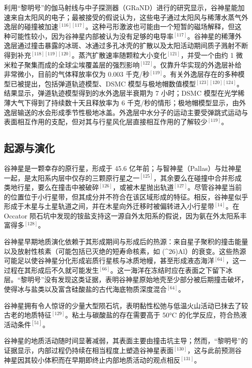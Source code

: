 利用“黎明号”的伽马射线与中子探测器（GRaND）进行的研究显示，谷神星能加速来自太阳风的电子；最被接受的假说认为，这些电子通过太阳风与稀薄水蒸气外逸层的碰撞被加速$^{[116][117]}$。这种弓形激波也可能由一个短暂的磁场解释，但这种可能性较小，因为谷神星内部被认为没有足够的电导率$^{[117]}$。谷神星的稀薄外逸层通过撞击暴露的冰斑、冰通过多孔冰壳的扩散以及太阳活动期间质子溅射不断得到补充$^{[118][119][120]}$。蒸汽扩散速率随颗粒大小变化$^{[121]}$，并受一个由约 1 微米粒子聚集而成的全球尘埃覆盖层的强烈影响$^{[122]}$。仅靠升华实现的外逸层补给非常微小，目前的气体释放率仅为 0.003 千克/秒$^{[119]}$。有关外逸层存在的多种模型已被提出，包括弹道轨迹模型、DSMC 模型与极地帽数值模型$^{[123][120][124]}$。结果显示，弹道轨迹模型得到的水外逸层半衰期为 7 小时；DSMC 模型在光学稀薄大气下得到了持续数十天且释放率为 6 千克/秒的情形；极地帽模型显示，由外逸层输送的水会形成季节性极地冰盖。外逸层中水分子的运动主要受弹跳式运动与表面相互作用的支配，但对其与行星风化层直接相互作用的了解较少$^{[119]}$。
\subsection{起源与演化}
谷神星是一颗幸存的原行星，形成于 45.6 亿年前；与智神星（Pallas）与灶神星一起，是太阳系内层中仅存的三颗原行星之一$^{[125]}$，其余要么在碰撞中合并形成类地行星，要么在撞击中被破碎$^{[126]}$，或被木星抛出轨道$^{[127]}$。尽管谷神星当前的位置位于小行星带，但其成分并不符合在该区域形成的特征。相反，谷神星似乎形成于木星与土星轨道之间，并在木星向外迁移时被偏转进入小行星带$^{[14]}$。在 Occator 陨石坑中发现的铵盐支持这一源自外太阳系的假说，因为氨在外太阳系丰富得多$^{[128]}$。

谷神星早期地质演化依赖于其形成期间与形成后的热源：来自星子聚积的撞击能量以及放射性核素（可能包括已灭绝的短寿命核素，如 (^{26})Al）的衰变。这些热源可能足以使谷神星分化形成岩质行星核与冰质地幔，甚至形成液态海洋$^{[64]}$，这一过程在其形成后不久就可能发生$^{[66]}$。这一海洋在冻结时应在表面之下留下冰层。“黎明号”没有发现这类证据，表明谷神星原始地壳至少部分被后期撞击破坏，使得冰与盐类以及富含硅酸盐的古代海底物质深度混合$^{[64]}$。

谷神星拥有令人惊讶的少量大型陨石坑，表明黏性松弛与低温火山活动已抹去了较古老的地质特征$^{[129]}$。粘土与碳酸盐的存在需要高于 50°C 的化学反应，符合热液活动条件$^{[51]}$。

谷神星的地质活动随时间显著减弱，其表面主要由撞击坑主导；然而，“黎明号”的证据显示，内部过程仍持续在相当程度上塑造谷神星表面$^{[130]}$，这与此前预测谷神星因其较小体积而在早期即终止内部地质活动的观点相反$^{[131]}$。
